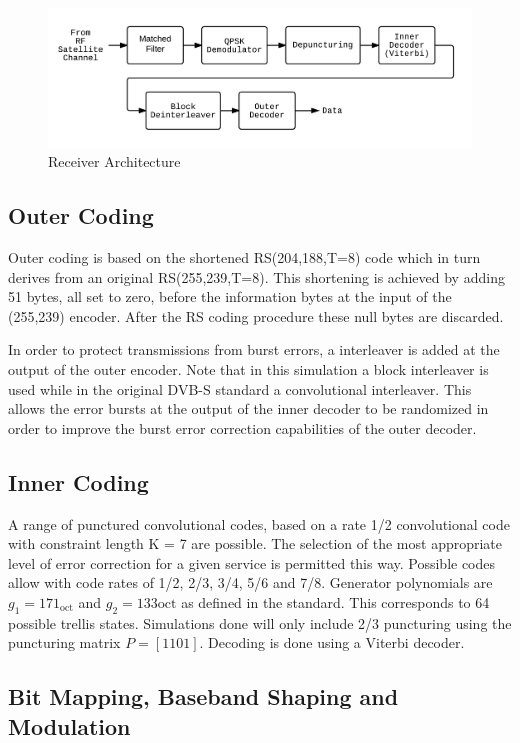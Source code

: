 \documentclass[paper=a4, fontsize=11pt]{scrartcl}	%
\numberwithin{equation}{section}		%
\numberwithin{figure}{section}			%
\numberwithin{table}{section}			%
\begin{document}
\begin{figure}[htb]
\centering
\includegraphics[scale=0.25]{ReceiverL.png}
\caption{Receiver Architecture}\label{fig:RxArch}
\end{figure}


\subsection{Outer Coding}

Outer coding is based on the shortened RS(204,188,T=8) code which in turn derives from an original RS(255,239,T=8). This shortening is achieved by adding 51 bytes, all set to zero, before the information bytes at the input of the (255,239) encoder. After the RS coding procedure these null bytes are discarded.

In order to protect transmissions from burst errors, a interleaver is added at the output of the outer encoder. Note that in this simulation a block interleaver is used while in the original DVB-S standard a convolutional interleaver. This allows the error bursts at the output of the inner decoder to be randomized in order to improve the burst error correction capabilities of the outer decoder.

\subsection{Inner Coding}

A range of punctured convolutional codes, based on a rate 1/2 convolutional code with constraint length K = 7 are possible. The selection of the most appropriate level of error correction for a given service is permitted this way. Possible codes allow with code rates of 1/2, 2/3, 3/4, 5/6 and 7/8. Generator polynomials are $g_1=171_{\text{oct}}$ and $g_2=133{\text{oct}}$ as defined in the standard. This corresponds to 64 possible trellis states. Simulations done will only include 2/3 puncturing using the puncturing matrix $P=[1 1 0 1]$. Decoding is done using a Viterbi decoder.

\subsection{Bit Mapping, Baseband Shaping and Modulation}
\end{document}
